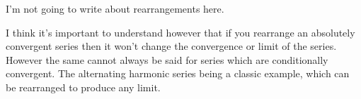 \documentclass[12pt]{article}
\theoremstyle{definition}
\begin{document}
            \begin{note}
                I'm not going to write about rearrangements here.
                
                I think it's important to understand however that if you rearrange an absolutely convergent series then it won't change the convergence or limit of the series. However the same cannot always be said for series which are conditionally convergent. The alternating harmonic series being a classic example, which can be rearranged to produce any limit.
            \end{note}
\end{document}
